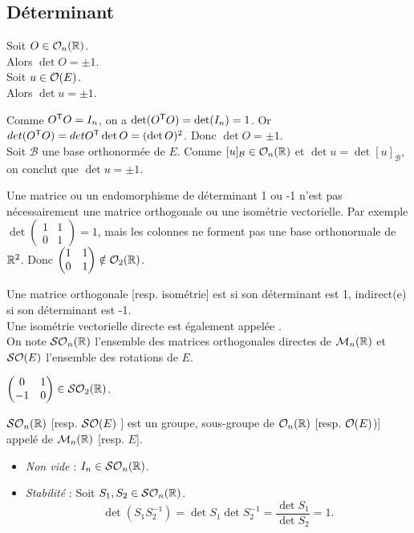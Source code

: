\documentclass{book}
\begin{document}
\subsection{Déterminant}

\begin{Proposition}[Déterminant]
Soit $O\in \mathcal{O}_{n}(\mathbb{R})$.\\
Alors $ \det O= \pm 1$.\\
 Soit $u\in \mathcal{O}(E)$.\\
Alors $ \det u= \pm 1$.
\end{Proposition}
\begin{Demonstration}
Comme $O^{\mathsf {T}}O=I_n$, on a $\mathop{\mathrm{det}}\nolimits (O^{\mathsf {T}}O) =\mathop{\mathrm{det}}\nolimits(I_n)=1$. Or $det (O^{\mathsf {T}}O)=det O^{\mathsf {T}}\mathop{\mathrm{det}}\nolimits O=(\mathop{\mathrm{det}}\nolimits O)^2$. Donc $ \det O= \pm 1$. \\
Soit $\mathcal{B}$ une base orthonormée de $E$.  Comme $[u]_{\mathcal{B}}\in \mathcal{O}_{n}(\mathbb{R})$ et $\det u= \det [u]_{\mathcal{B}}$, on conclut que $ \det u= \pm 1$.
\end{Demonstration}
\begin{Remarque}
Une matrice ou un endomorphisme de déterminant 1 ou -1 n'est pas nécessairement une matrice orthogonale ou une isométrie vectorielle. Par exemple $\det \begin{pmatrix}1 &1\\0&1\end{pmatrix}=1$, mais les colonnes ne forment pas une base orthonormale de $\mathbb{R}^2$. Donc $\begin{pmatrix}1 &1\\0&1\end{pmatrix}\notin\mathcal{O}_2(\mathbb{R})$. 
\end{Remarque}
\begin{Definition}
Une matrice orthogonale [resp. isométrie] est  si son déterminant est 1, indirect(e) si son déterminant est -1.\\
Une isométrie vectorielle directe est également appelée .\\
On note $\mathcal{SO}_{n}(\mathbb{R})$ l'ensemble des matrices orthogonales directes de $\mathcal{M}_{n}(\mathbb{R})$ et $\mathcal{SO}(E)$ l'ensemble des rotations de $E$.
\end{Definition}
\begin{Exemple}
$\begin{pmatrix}0 &1\\-1&0\end{pmatrix}\in \mathcal{SO}_2(\mathbb{R})$.
\end{Exemple}
\begin{Proposition}[Groupe]
$\mathcal{SO}_{n}(\mathbb{R})$ [resp. $\mathcal{SO}(E)$ ] est un groupe, sous-groupe de $\mathcal{O}_{n}(\mathbb{R})$ [resp. $\mathcal{O}(E)$)] appelé  de $\mathcal{M}_{n}(\mathbb{R})$ [resp. $E$].
\end{Proposition}
\begin{Demonstration}
\begin{itemize}
\item \textit{Non vide} : $I_n\in \mathcal{SO}_{n}(\mathbb{R})$.
\item \textit{Stabilité} :  Soit $S_1,S_2\in \mathcal{SO}_{n}(\mathbb{R})$. $$\det (S_1 S_2^{-1})=\det S_1 \det S_2^{-1}=\frac{\det S_1}{ \det S_2}=1.$$
\end{itemize}
\end{Demonstration}
\end{document}
